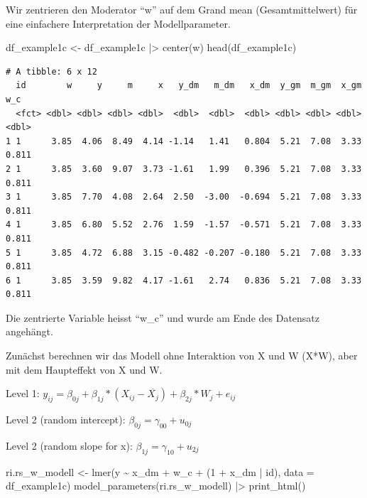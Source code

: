 \documentclass[
  letterpaper,
  DIV=11,
  numbers=noendperiod]{scrreprt}
\newenvironment{Shaded}{\begin{snugshade}}{\end{snugshade}}
\newcommand{\AttributeTok}[1]{\textcolor[rgb]{0.40,0.45,0.13}{#1}}
\newcommand{\DecValTok}[1]{\textcolor[rgb]{0.68,0.00,0.00}{#1}}
\newcommand{\FunctionTok}[1]{\textcolor[rgb]{0.28,0.35,0.67}{#1}}
\newcommand{\NormalTok}[1]{\textcolor[rgb]{0.00,0.23,0.31}{#1}}
\newcommand{\OtherTok}[1]{\textcolor[rgb]{0.00,0.23,0.31}{#1}}
\newcommand{\SpecialCharTok}[1]{\textcolor[rgb]{0.37,0.37,0.37}{#1}}
\begin{document}
Wir zentrieren den Moderator ``w'' auf dem Grand mean (Gesamtmittelwert)
für eine einfachere Interpretation der Modellparameter.

\begin{Shaded}
\begin{Highlighting}[]
\NormalTok{df\_example1c }\OtherTok{\textless{}{-}}\NormalTok{ df\_example1c }\SpecialCharTok{|\textgreater{}} \FunctionTok{center}\NormalTok{(w)}
\FunctionTok{head}\NormalTok{(df\_example1c)}
\end{Highlighting}
\end{Shaded}

\begin{verbatim}
# A tibble: 6 x 12
  id        w     y     m     x   y_dm   m_dm   x_dm  y_gm  m_gm  x_gm   w_c
  <fct> <dbl> <dbl> <dbl> <dbl>  <dbl>  <dbl>  <dbl> <dbl> <dbl> <dbl> <dbl>
1 1      3.85  4.06  8.49  4.14 -1.14   1.41   0.804  5.21  7.08  3.33 0.811
2 1      3.85  3.60  9.07  3.73 -1.61   1.99   0.396  5.21  7.08  3.33 0.811
3 1      3.85  7.70  4.08  2.64  2.50  -3.00  -0.694  5.21  7.08  3.33 0.811
4 1      3.85  6.80  5.52  2.76  1.59  -1.57  -0.571  5.21  7.08  3.33 0.811
5 1      3.85  4.72  6.88  3.15 -0.482 -0.207 -0.180  5.21  7.08  3.33 0.811
6 1      3.85  3.59  9.82  4.17 -1.61   2.74   0.836  5.21  7.08  3.33 0.811
\end{verbatim}

Die zentrierte Variable heisst ``w\_c'' und wurde am Ende des Datensatz
angehängt.

Zunächst berechnen wir das Modell ohne Interaktion von X und W (X*W),
aber mit dem Haupteffekt von X und W.

Level 1:
\(y_{ij} = \beta_{0j} + \beta_{1j}*(X_{ij}-\overline{X_j}) + \beta_{2j}*W_{j} + e_{ij}\)

Level 2 (random intercept): \(\beta_{0j} = \gamma_{00} + u_{0j}\)

Level 2 (random slope for x): \(\beta_{1j} = \gamma_{10} + u_{2j}\)

\begin{Shaded}
\begin{Highlighting}[]
\NormalTok{ri.rs\_w\_modell }\OtherTok{\textless{}{-}} \FunctionTok{lmer}\NormalTok{(y }\SpecialCharTok{\textasciitilde{}}\NormalTok{ x\_dm }\SpecialCharTok{+}\NormalTok{ w\_c }\SpecialCharTok{+}\NormalTok{ (}\DecValTok{1} \SpecialCharTok{+}\NormalTok{ x\_dm }\SpecialCharTok{|}\NormalTok{ id), }\AttributeTok{data =}\NormalTok{ df\_example1c)}
\FunctionTok{model\_parameters}\NormalTok{(ri.rs\_w\_modell) }\SpecialCharTok{|\textgreater{}} \FunctionTok{print\_html}\NormalTok{()}
\end{Highlighting}
\end{Shaded}
\end{document}

